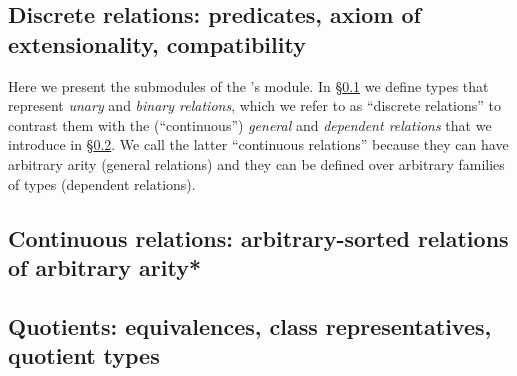 \documentclass[a4paper,UKenglish,cleveref,autoref,thm-restate,12pt]{../lipics-v2021-wjd}
\begin{document}
\subsection{Discrete relations: predicates, axiom of extensionality, compatibility}\label{sec:discrete-relations}
Here we present the submodules of the \agdaualib's  module. In \S\ref{sec:discrete-relations} we define types that represent \emph{unary} and \emph{binary relations}, which we refer to as ``discrete relations'' to contrast them with the (``continuous'') \emph{general} and \emph{dependent relations} that we introduce in \S\ref{sec:continuous-relations}. We call the latter ``continuous relations'' because they can have arbitrary arity (general relations) and they can be defined over arbitrary families of types (dependent relations).



\subsection{Continuous relations: arbitrary-sorted relations of arbitrary arity*\protect\footnotemark}\label{sec:continuous-relations}


\subsection{Quotients: equivalences, class representatives, quotient types}\label{sec:equiv-relat-quot}

\end{document}
